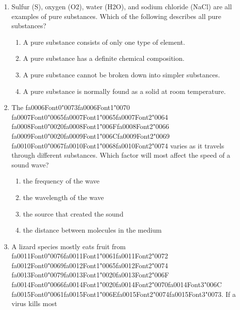 \documentclass[12pt]{article}
\begin{document}
\begin{enumerate}[label=\arabic*.]
\item Sulfur (S), oxygen (O2), water (H2O), and sodium chloride (NaCl) are all examples of pure
substances. Which of the following describes all pure substances?
\begin{enumerate}[label=(\alph*)]
    \item A pure substance consists of only one type of element.
    \item A pure substance has a definite chemical composition.
    \item A pure substance cannot be broken down into simpler substances.
    \item A pure substance is normally found as a solid at room temperature.
\end{enumerate}
\item The {\csname fa0006Font0\endcsname\char"0073}{\csname fa0006Font1\endcsname\char"0070} {\csname fa0007Font0\endcsname\char"0065}{\csname fa0007Font1\endcsname\char"0065}{\csname fa0007Font2\endcsname\char"0064} {\csname fa0008Font0\endcsname\char"0020}{\csname fa0008Font1\endcsname\char"006F}{\csname fa0008Font2\endcsname\char"0066} {\csname fa0009Font0\endcsname\char"0020}{\csname fa0009Font1\endcsname\char"006C}{\csname fa0009Font2\endcsname\char"0069} {\csname fa0010Font0\endcsname\char"0067}{\csname fa0010Font1\endcsname\char"0068}{\csname fa0010Font2\endcsname\char"0074} varies as it travels through different substances. Which factor
will most affect the speed of a sound wave?
\begin{enumerate}[label=(\alph*)]
    \item the frequency of the wave
    \item the wavelength of the wave
    \item the source that created the sound
    \item the distance between molecules in the medium
\end{enumerate}
\item A lizard species mostly eats fruit from {\csname fa0011Font0\endcsname\char"0076}{\csname fa0011Font1\endcsname\char"0061}{\csname fa0011Font2\endcsname\char"0072} {\csname fa0012Font0\endcsname\char"0069}{\csname fa0012Font1\endcsname\char"0065}{\csname fa0012Font2\endcsname\char"0074} {\csname fa0013Font0\endcsname\char"0079}{\csname fa0013Font1\endcsname\char"0020}{\csname fa0013Font2\endcsname\char"006F} {\csname fa0014Font0\endcsname\char"0066}{\csname fa0014Font1\endcsname\char"0020}{\csname fa0014Font2\endcsname\char"0070}{\csname fa0014Font3\endcsname\char"006C} {\csname fa0015Font0\endcsname\char"0061}{\csname fa0015Font1\endcsname\char"006E}{\csname fa0015Font2\endcsname\char"0074}{\csname fa0015Font3\endcsname\char"0073}. If a virus kills most

\end{enumerate}
\end{document}
